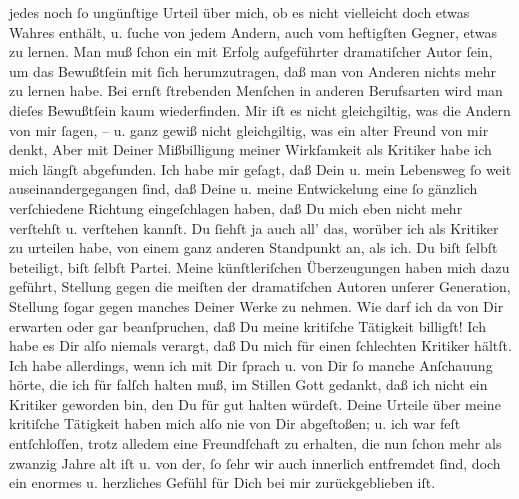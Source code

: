 \begin{ledgroupsized}[t]{13cm}
               jedes noch ſo ungünſtige Urteil über mich, ob es nicht vielleicht doch etwas Wahres
               enthält, u. ſuche von jedem Andern, auch vom heftigſten Gegner, etwas zu lernen. Man
               muß ſchon ein mit Erfolg aufgeführter dramatiſcher Autor ſein, {\pb}um das Bewußtſein mit ſich herumzutragen, daß
               man von Anderen nichts mehr zu lernen habe. Bei ernſt ſtrebenden Menſchen in anderen
               Berufsarten wird man dieſes Bewußtſein kaum wiederfinden.\pend
           \pstart
           Mir iſt es nicht gleichgiltig, was die Andern von mir ſagen, – u. ganz gewiß nicht
               gleichgiltig, was ein alter Freund von mir denkt, Aber mit Deiner Mißbilligung meiner
               Wirkſamkeit als Kritiker habe ich mich \introOben{}längſt\introOben{} abgefunden.
               Ich habe mir geſagt, daß Dein u. mein Lebensweg ſo
               weit auseinandergegangen ſind, {\pb}daß Deine u. meine
               Entwickelung eine ſo gänzlich verſchiedene Richtung eingeſchlagen haben, daß Du mich
               eben nicht mehr verſtehſt u. verſtehen kannſt. Du ſiehſt ja auch all’ das, worüber
               ich als Kritiker zu urteilen habe, von einem ganz anderen Standpunkt an, als ich. Du
               biſt ſelbſt beteiligt, biſt ſelbſt Partei. Meine künſtleriſchen Überzeugungen haben
               mich dazu geführt, Stellung gegen  die meiſten der dramatiſchen Autoren unſerer Generation, Stellung ſogar gegen
               manches Deiner Werke zu nehmen. {\pb}Wie darf ich da
               von Dir erwarten oder gar beanſpruchen, daß Du meine kritiſche Tätigkeit
               billigſt!\pend
           \pstart
           Ich habe es Dir alſo niemals verargt, daß Du mich für einen ſchlechten Kritiker
               hältſt. Ich habe allerdings, wenn ich mit Dir ſprach u. von Dir ſo manche Anſchauung
               hörte, die ich für falſch halten muß, im Stillen Gott gedankt, daß ich nicht ein
               Kritiker geworden bin, den Du für gut halten würdeſt.\pend
           \pstart
           {\pb}Deine Urteile über meine kritiſche Tätigkeit
               haben mich alſo nie von Dir abgeſtoßen; u. ich war feſt entſchloſſen, trotz alledem
                  \strikeout{\textcolor{gray}{Dir}} eine Freundſchaft zu erhalten, die nun ſchon mehr als zwanzig Jahre alt
                  iſt\strikeout{,} u. von der, ſo ſehr wir auch innerlich
               entfremdet ſind, doch ein enormes u. herzliches Gefühl für Dich bei mir
               zurückgeblieben iſt.\strikeout{\textcolor{gray}{×}}\pend

\end{ledgroupsized}

